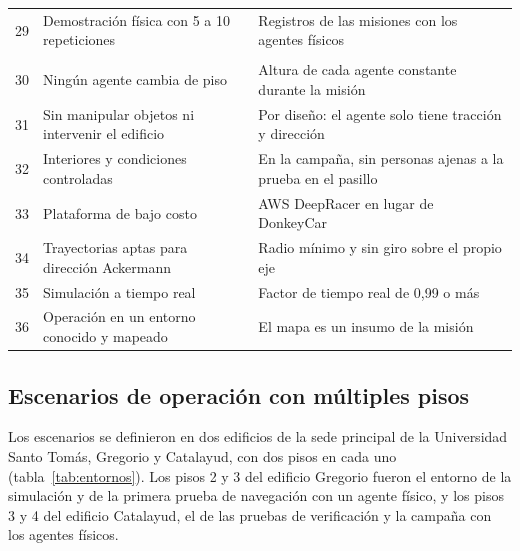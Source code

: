 \begin{table}[H]
\begin{tabular}{@{}c>{\raggedright\arraybackslash}p{}>{\raggedright\arraybackslash}p{}@{}}
    29 & Demostración física con 5 a 10 repeticiones & Registros de las misiones con los agentes físicos \\ \addlinespace
    \multicolumn{3}{@{}l}{\textit{Restricciones del alcance}} \\
    30 & Ningún agente cambia de piso & Altura de cada agente constante durante la misión \\
    31 & Sin manipular objetos ni intervenir el edificio & Por diseño: el agente solo tiene tracción y dirección \\
    32 & Interiores y condiciones controladas & En la campaña, sin personas ajenas a la prueba en el pasillo \\
    33 & Plataforma de bajo costo & AWS DeepRacer en lugar de DonkeyCar \\
    34 & Trayectorias aptas para dirección Ackermann & Radio mínimo y sin giro sobre el propio eje \\
    35 & Simulación a tiempo real & Factor de tiempo real de 0,99 o más \\
    36 & Operación en un entorno conocido y mapeado & El mapa es un insumo de la misión \\ \bottomrule
  \end{tabular}
\end{table}

\subsection{Escenarios de operación con múltiples pisos}
\label{sec:entornos}

Los escenarios se definieron en dos edificios de la sede principal de la Universidad Santo Tomás, Gregorio y Catalayud, con dos pisos en cada uno (tabla~\ref{tab:entornos}). Los pisos 2 y 3 del edificio Gregorio fueron el entorno de la simulación y de la primera prueba de navegación con un agente físico, y los pisos 3 y 4 del edificio Catalayud, el de las pruebas de verificación y la campaña con los agentes físicos.

